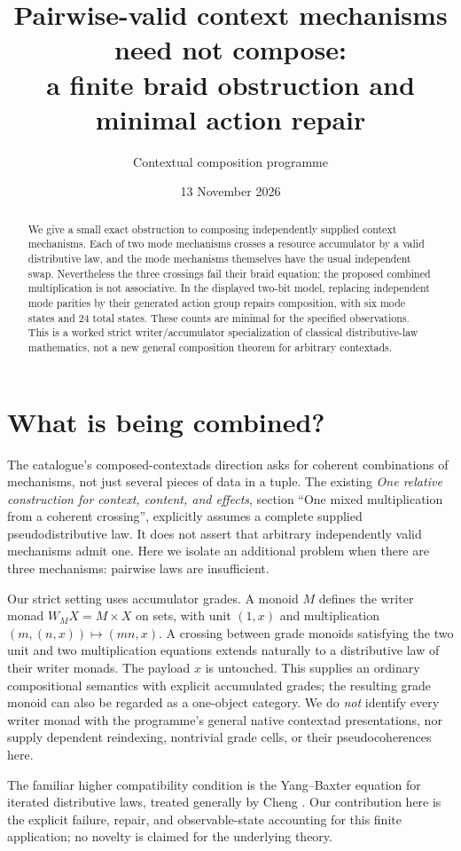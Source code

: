 \documentclass[11pt]{article}
\title{Pairwise-valid context mechanisms need not compose:\\a finite braid obstruction and minimal action repair}
\author{Contextual composition programme}
\date{13 November 2026}
\begin{document}
\maketitle
\begin{abstract}
We give a small exact obstruction to composing independently supplied context
mechanisms. Each of two mode mechanisms crosses a resource accumulator by a
valid distributive law, and the mode mechanisms themselves have the usual
independent swap. Nevertheless the three crossings fail their braid equation;
the proposed combined multiplication is not associative. In the displayed
two-bit model, replacing independent mode parities by their generated action
group repairs composition, with six mode states and 24 total states. These
counts are minimal for the specified observations. This is a worked strict
writer/accumulator specialization of classical distributive-law mathematics,
not a new general composition theorem for arbitrary contextads.
\end{abstract}

\section{What is being combined?}
The catalogue's composed-contextads direction asks for coherent combinations
of mechanisms, not just several pieces of data in a tuple. The existing
\emph{One relative construction for context, content, and effects}, section
``One mixed multiplication from a coherent crossing'', explicitly assumes a
complete supplied pseudodistributive law. It does not assert that arbitrary
independently valid mechanisms admit one. Here we isolate an additional
problem when there are three mechanisms: pairwise laws are insufficient.

Our strict setting uses accumulator grades. A monoid $M$ defines the writer
monad $W_M X=M\times X$ on sets, with unit $(1,x)$ and multiplication
$(m,(n,x))\mapsto(mn,x)$. A crossing between grade monoids satisfying the two
unit and two multiplication equations extends naturally to a distributive
law of their writer monads. The payload $x$ is untouched. This supplies an
ordinary compositional semantics with explicit accumulated grades; the
resulting grade monoid can also be regarded as a one-object category. We do
\emph{not} identify every writer monad with the programme's general native
contextad presentations, nor supply dependent reindexing, nontrivial grade
cells, or their pseudocoherences here.

The familiar higher compatibility condition is the Yang--Baxter equation
for iterated distributive laws, treated generally by Cheng
\cite{Cheng}. Our contribution here is the explicit failure, repair, and
observable-state accounting for this finite application; no novelty is
claimed for the underlying theory.
\end{document}
